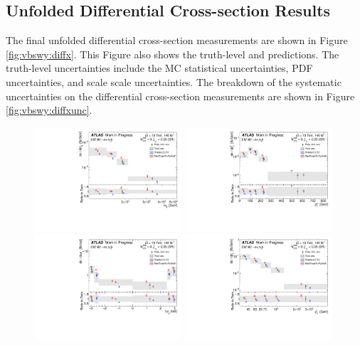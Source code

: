 \subsection{Unfolded Differential Cross-section Results}
\label{sec:vbswy:unfxsec}

The final unfolded differential cross-section measurements are shown in Figure \ref{fig:vbswy:diffx}. This Figure also shows the truth-level \SHERPA and \MADGRAPH \ewwy predictions. The truth-level uncertainties include the MC statistical uncertainties, PDF uncertainties, and scale scale uncertainties. The breakdown of the systematic uncertainties on the differential cross-section measurements are shown in Figure \ref{fig:vbswy:diffxunc}.

\begin{figure}[t]
  \centering
  \includegraphics[width=0.49\textwidth]{plots/diffx/diffxsections/m_jj_WIP_12Feb.pdf}
  \includegraphics[width=0.49\textwidth]{plots/diffx/diffxsections/pT_jj_WIP_12Feb.pdf}
  \includegraphics[width=0.49\textwidth]{plots/diffx/diffxsections/Dphi_jj_WIP_12Feb.pdf}
  \includegraphics[width=0.49\textwidth]{plots/diffx/diffxsections/pT_l_WIP_12Feb.pdf}

\end{figure}
